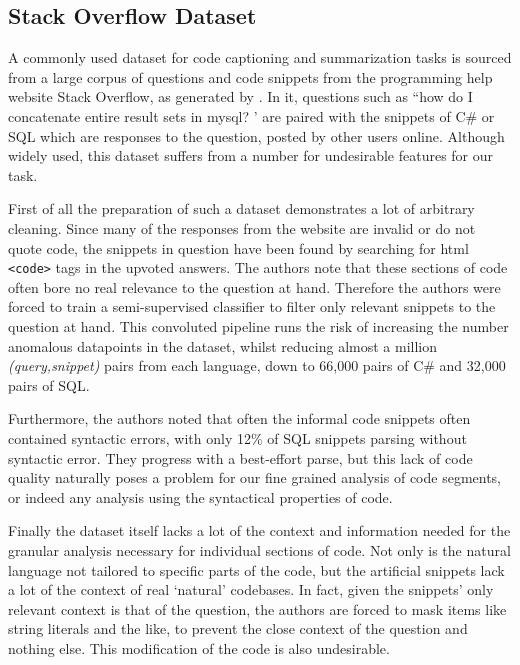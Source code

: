 \subsection{Stack Overflow Dataset}

A commonly used dataset for code captioning and summarization tasks is sourced from a large corpus of questions and code snippets from the programming help website Stack Overflow, as generated by \citet{iyer_summarizing_2016}. In it, questions such as ``how do I concatenate entire result sets in mysql? ' are paired with the snippets of C\# or SQL which are responses to the question, posted by other users online.
Although widely used, this dataset suffers from a number for undesirable features for our task. 

First of all the preparation of such a dataset demonstrates a lot of arbitrary cleaning.
Since many of the responses from the website are invalid or do not quote code, the snippets in question have been found by searching for html \texttt{<code>} tags in the upvoted answers. 
The authors note that these sections of code often bore no real relevance to the question at hand. Therefore the authors were forced to train a semi-supervised classifier to filter only relevant snippets to the question at hand.
This convoluted pipeline runs the risk of increasing the number anomalous datapoints in the dataset, whilst reducing almost a million \textit{(query,snippet)} pairs from each language, down to 66,000 pairs  of C\# and 32,000 pairs of SQL.

Furthermore, the authors noted that often the informal code snippets often contained syntactic errors, with only 12\% of SQL snippets parsing without syntactic error. They progress with a best-effort parse, but this lack of code quality naturally poses a problem for our fine grained analysis of code segments, or indeed any analysis using the syntactical properties of code.

Finally the dataset itself lacks a lot of the context and information needed for the granular analysis necessary for individual sections of code. Not only is the natural language not tailored to specific parts of the code, but the artificial snippets lack a lot of the context of real `natural' codebases. In fact, given the snippets' only relevant context is that of the question, the authors are forced to mask items like string literals and the like, to prevent the close context of the question and nothing else. This modification of the code is also undesirable.

